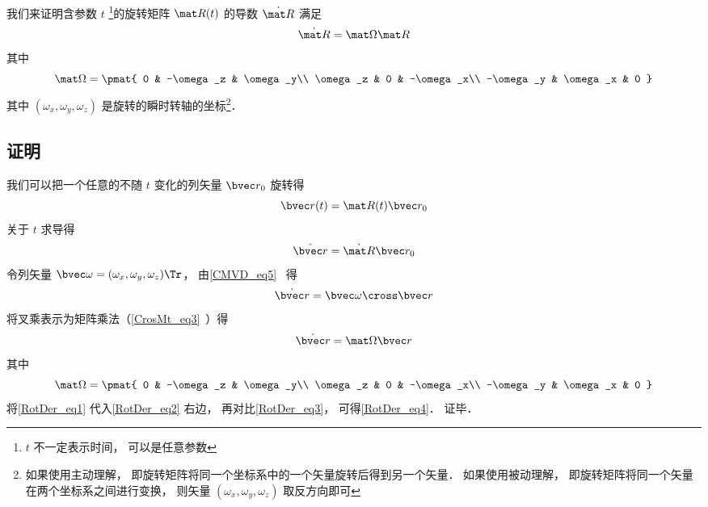 

我们来证明含参数 $t$ \footnote{$t$ 不一定表示时间， 可以是任意参数}的旋转矩阵 $\mat R(t)$ 的导数 $\dot{\mat R}$ 满足
\begin{equation}\label{RotDer_eq4}
\dot{\mat R} = \mat \Omega \mat R
\end{equation}
其中
\begin{equation}
\mat \Omega = \pmat{
0 & -\omega_z & \omega_y\\
\omega_z & 0 & -\omega_x\\
-\omega_y & \omega_x & 0
}
\end{equation}
其中 $(\omega_x, \omega_y, \omega_z)$ 是旋转的瞬时转轴的坐标\footnote{如果使用主动理解， 即旋转矩阵将同一个坐标系中的一个矢量旋转后得到另一个矢量． 如果使用被动理解， 即旋转矩阵将同一个矢量在两个坐标系之间进行变换， 则矢量 $(\omega_x, \omega_y, \omega_z)$ 取反方向即可}．%

\subsection{证明}
我们可以把一个任意的不随 $t$ 变化的列矢量 $\bvec r_0$ 旋转得
\begin{equation}\label{RotDer_eq1}
\bvec r(t) = \mat R(t) \bvec r_0
\end{equation}
关于 $t$ 求导得
\begin{equation}\label{RotDer_eq3}
\dot{\bvec r} = \dot{\mat R} \bvec r_0
\end{equation}
令列矢量 $\bvec \omega = (\omega_x, \omega_y, \omega_z)\Tr$， 由\autoref{CMVD_eq5}~ 得
\begin{equation}
\dot{\bvec r} = \bvec\omega \cross \bvec r
\end{equation}
将叉乘表示为矩阵乘法（\autoref{CrosMt_eq3}~）得
\begin{equation}\label{RotDer_eq2}
\dot{\bvec r} = \mat\Omega \bvec r
\end{equation}
其中
\begin{equation}
\mat \Omega = \pmat{
0 & -\omega_z & \omega_y\\
\omega_z & 0 & -\omega_x\\
-\omega_y & \omega_x & 0
}\end{equation}
将\autoref{RotDer_eq1} 代入\autoref{RotDer_eq2} 右边， 再对比\autoref{RotDer_eq3}， 可得\autoref{RotDer_eq4}． 证毕．
